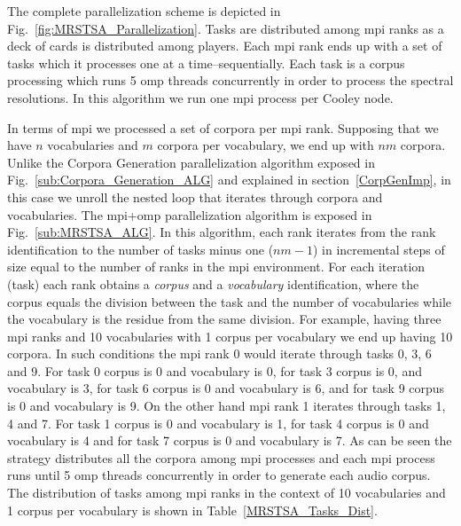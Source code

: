 {The complete parallelization scheme is depicted in Fig.~\ref{fig:MRSTSA_Parallelization}. Tasks are distributed among \gls{mpi} ranks as a deck of cards is distributed among players. Each \gls{mpi} rank ends up with a set of tasks which it processes one at a time--sequentially. Each task is a corpus processing which runs 5 \gls{omp} threads concurrently in order to process the spectral resolutions. In this algorithm we run one \gls{mpi} process per Cooley node.%

In terms of \gls{mpi} we processed a set of corpora per \gls{mpi} rank. Supposing that we have $n$ vocabularies and $m$ corpora per vocabulary, we end up with $n m$ corpora. Unlike the Corpora Generation parallelization algorithm exposed in Fig.~\ref{sub:Corpora_Generation_ALG} and explained in section~\ref{CorpGenImp}, in this case we unroll the nested loop that iterates through corpora and vocabularies. The \gls{mpi}+\gls{omp} parallelization algorithm is exposed in Fig.~\ref{sub:MRSTSA_ALG}. In this algorithm, each rank iterates from the rank identification to the number of tasks minus one ($n m - 1$) in incremental steps of size equal to the number of ranks in the \gls{mpi} environment. For each iteration (task) each rank obtains a \emph{corpus} and a \emph{vocabulary} identification, where the corpus equals the division between the task and the number of vocabularies while the vocabulary is the residue from the same division. For example, having three \gls{mpi} ranks and 10 vocabularies with 1 corpus per vocabulary we end up having 10 corpora. In such conditions the \gls{mpi} rank 0 would iterate through tasks 0, 3, 6 and 9. For task 0 corpus is 0 and vocabulary is 0, for task 3 corpus is 0, and vocabulary is 3, for task 6 corpus is 0 and vocabulary is 6, and for task 9 corpus is 0 and vocabulary is 9. On the other hand \gls{mpi} rank 1 iterates through tasks 1, 4 and 7. For task 1 corpus is 0 and vocabulary is 1, for task 4 corpus is 0 and vocabulary is 4 and for task 7 corpus is 0 and vocabulary is 7. As can be seen the strategy distributes all the corpora among \gls{mpi} processes and each \gls{mpi} process runs until 5 \gls{omp} threads concurrently in order to generate each audio corpus. The distribution of tasks among \gls{mpi} ranks in the context of 10 vocabularies and 1 corpus per vocabulary is shown in Table~\ref{MRSTSA_Tasks_Dist}. 

}
